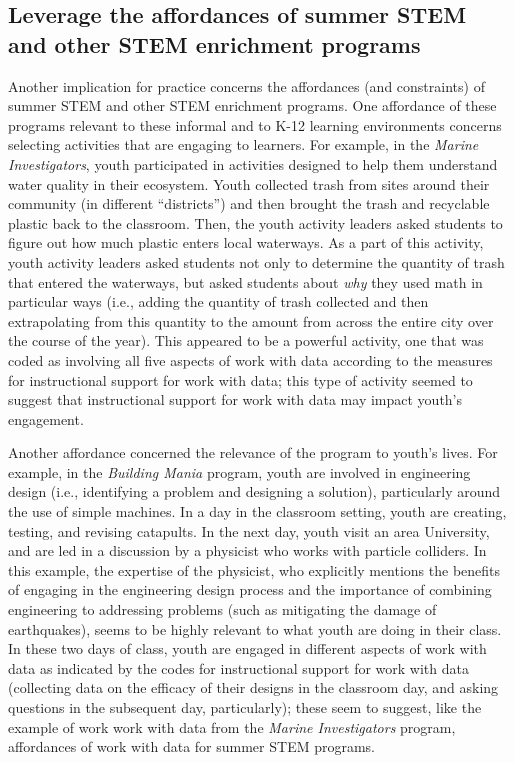 \documentclass[]{book}
\theoremstyle{definition}
\theoremstyle{definition}
\theoremstyle{definition}
\theoremstyle{remark}
\begin{document}
\subsection{Leverage the affordances of summer STEM and other STEM
enrichment
programs}\label{leverage-the-affordances-of-summer-stem-and-other-stem-enrichment-programs}

Another implication for practice concerns the affordances (and
constraints) of summer STEM and other STEM enrichment programs. One
affordance of these programs relevant to these informal and to K-12
learning environments concerns selecting activities that are engaging to
learners. For example, in the \emph{Marine Investigators}, youth
participated in activities designed to help them understand water
quality in their ecosystem. Youth collected trash from sites around
their community (in different ``districts'') and then brought the trash
and recyclable plastic back to the classroom. Then, the youth activity
leaders asked students to figure out how much plastic enters local
waterways. As a part of this activity, youth activity leaders asked
students not only to determine the quantity of trash that entered the
waterways, but asked students about \emph{why} they used math in
particular ways (i.e., adding the quantity of trash collected and then
extrapolating from this quantity to the amount from across the entire
city over the course of the year). This appeared to be a powerful
activity, one that was coded as involving all five aspects of work with
data according to the measures for instructional support for work with
data; this type of activity seemed to suggest that instructional support
for work with data may impact youth's engagement.

Another affordance concerned the relevance of the program to youth's
lives. For example, in the \emph{Building Mania} program, youth are
involved in engineering design (i.e., identifying a problem and
designing a solution), particularly around the use of simple machines.
In a day in the classroom setting, youth are creating, testing, and
revising catapults. In the next day, youth visit an area University, and
are led in a discussion by a physicist who works with particle
colliders. In this example, the expertise of the physicist, who
explicitly mentions the benefits of engaging in the engineering design
process and the importance of combining engineering to addressing
problems (such as mitigating the damage of earthquakes), seems to be
highly relevant to what youth are doing in their class. In these two
days of class, youth are engaged in different aspects of work with data
as indicated by the codes for instructional support for work with data
(collecting data on the efficacy of their designs in the classroom day,
and asking questions in the subsequent day, particularly); these seem to
suggest, like the example of work work with data from the \emph{Marine
Investigators} program, affordances of work with data for summer STEM
programs.
\end{document}
